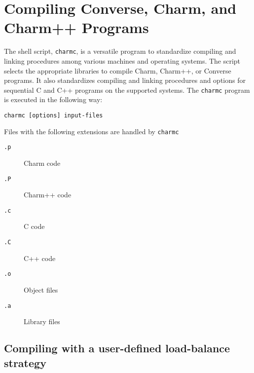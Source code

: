 %
%
%
%
%
%
%

\section{Compiling Converse, Charm, and Charm++ Programs}

The shell script, {\tt charmc}, is a versatile program to standardize
compiling and linking procedures among various machines and operating
systems.  The script selects the appropriate libraries to compile
Charm, Charm++, or Converse programs.  It also standardizes compiling
and linking procedures and options for sequential C and C++ programs
on the supported systems.  The {\tt charmc} program is executed in the
following way:

\begin{verbatim}
charmc [options] input-files
\end{verbatim}

Files with the following extensions are handled by {\verb+charmc+}
\begin{description}
\item[{\verb+.p+}] Charm code
\item[{\verb+.P+}] Charm++ code
\item[{\verb+.c+}] C code
\item[{\verb+.C+}] C++ code
\item[{\verb+.o+}] Object files
\item[{\verb+.a+}] Library files
\end{description}

\subsection{Compiling with a user-defined load-balance strategy}

